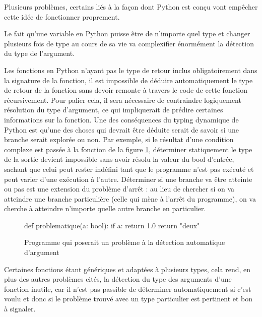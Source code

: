 \documentclass[a4paper]{report}
\begin{document}
Plusieurs problèmes, certains liés à la façon dont Python est conçu vont empêcher cette idée de fonctionner proprement.

Le fait qu'une variable en Python puisse être de n'importe quel type et changer plusieurs fois de type au cours de sa vie va complexifier énormément la détection du type de l'argument.

Les fonctions en Python n'ayant pas le type de retour inclus obligatoirement dans la signature de la fonction, il est impossible de déduire automatiquement le type de retour de la fonction sans devoir remonte  à travers le code de cette fonction récursivement.
Pour palier cela, il sera nécessaire de contraindre logiquement résolution du type d'argument, ce qui impliquerait de prédire certaines informations sur la fonction.
Une des conséquences du typing dynamique de Python est qu'une des choses qui devrait être déduite serait de savoir si une branche serait explorée ou non.
Par exemple, si le résultat d'une condition complexe est passée à la fonction de la figure \ref{fig:condition_complexe_résolution}, déterminer statiquement le type de la sortie devient impossible sans avoir résolu la valeur du bool d'entrée, sachant que celui peut rester indéfini tant que le programme n'est pas exécuté et peut varier d'une exécution à l'autre.
Déterminer si une branche va être atteinte ou pas est une extension du problème d'arrêt \cite{burkholder1987halting}: au lieu de chercher si on va atteindre une branche particulière (celle qui mène à l'arrêt du programme), on va cherche à atteindre n'importe quelle autre branche en particulier.

\begin{figure}[ht]
\begin{python}

def problematique(a: bool):
	if a:
		return 1.0
	return "deux"
\end{python}
	\caption{Programme qui poserait un problème à la détection automatique d'argument}
	
	\label{fig:condition_complexe_résolution}
\end{figure}

Certaines fonctions étant génériques et adaptées à plusieurs types, cela rend, en plus des autres problèmes cités, la détection du type des arguments d'une fonction inutile, car il n'est pas passible de déterminer automatiquement si c'est voulu et donc si le problème trouvé avec un type particulier est pertinent et bon à signaler.
\end{document}
